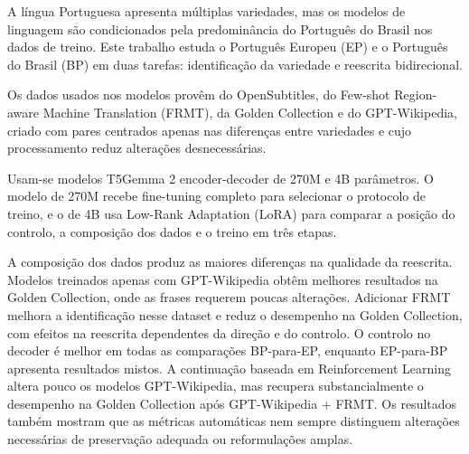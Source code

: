 \acresetall
\noindent A língua Portuguesa apresenta múltiplas variedades, mas os modelos de linguagem são condicionados pela predominância do Português do Brasil nos dados de treino. Este trabalho estuda o Português Europeu (EP) e o Português do Brasil (BP) em duas tarefas: identificação da variedade e reescrita bidirecional.

Os dados usados nos modelos provêm do OpenSubtitles, do Few-shot Region-aware Machine Translation (FRMT), da Golden Collection e do GPT-Wikipedia, criado com pares centrados apenas nas diferenças entre variedades e cujo processamento reduz alterações desnecessárias.

Usam-se modelos T5Gemma 2 encoder-decoder de 270M e 4B parâmetros. O modelo de 270M recebe fine-tuning completo para selecionar o protocolo de treino, e o de 4B usa Low-Rank Adaptation (LoRA) para comparar a posição do controlo, a composição dos dados e o treino em três etapas.

A composição dos dados produz as maiores diferenças na qualidade da reescrita. Modelos treinados apenas com GPT-Wikipedia obtêm melhores resultados na Golden Collection, onde as frases requerem poucas alterações. Adicionar FRMT melhora a identificação nesse dataset e reduz o desempenho na Golden Collection, com efeitos na reescrita dependentes da direção e do controlo. O controlo no decoder é melhor em todas as comparações BP-para-EP, enquanto EP-para-BP apresenta resultados mistos. A continuação baseada em Reinforcement Learning altera pouco os modelos GPT-Wikipedia, mas recupera substancialmente o desempenho na Golden Collection após GPT-Wikipedia + FRMT. Os resultados também mostram que as métricas automáticas nem sempre distinguem alterações necessárias de preservação adequada ou reformulações amplas.
\clearpage
